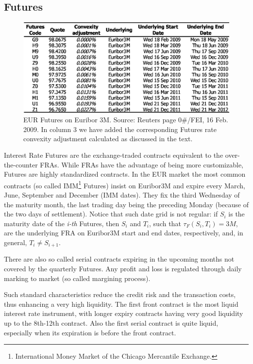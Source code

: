 \documentclass[11pt,reqno]{amsart}
\begin{document}
\subsection{Futures}
\label{sec:Futures}
\begin{figure}[tbp]
\centering
\includegraphics[scale=0.9]{./FigMktFut3M}
\caption{EUR Futures on Euribor 3M. Source: Reuters page 0\#/FEI, 16 Feb. 2009. In column 3 we have added the corresponding Futures rate convexity adjustment calculated as discussed in the text.}
\label{fig:Futures3M}
\end{figure}
Interest Rate Futures are the exchange-traded contracts equivalent to the over-the-counter FRAs. While FRAs have the advantage of being more customizable, Futures are highly standardized contracts. In the EUR market the most common contracts (so called IMM\footnote{International Money Market of the Chicago Mercantile Exchange.} Futures) insist on Euribor3M and expire every March, June, September and December (IMM dates). They fix the third Wednesday of the maturity month, the last trading day being the preceding Monday (because of the two days of settlement). Notice that  such date grid is not regular: if $S_i$ is the maturity date of the \textit{i-th} Futures, then $S_i$ and $T_i$, such that $\tau_F\left(S_i,T_i\right)=3M$, are the underlying FRA on Euribor3M start and end dates, respectively, and, in general, $T_i\neq S_{i+1}$.
\par
There are also so called serial contracts expiring in the upcoming months not covered by the quarterly Futures. Any profit and loss is regulated through daily marking to market (so called margining process).
\par
Such standard characteristics reduce the credit risk and the transaction costs, thus enhancing a very high liquidity. The first front contract is the most liquid interest rate instrument, with longer expiry contracts having very good liquidity up to the 8th-12th contract. Also the first serial contract is quite liquid, especially when its expiration is before the front contract.
\end{document}
